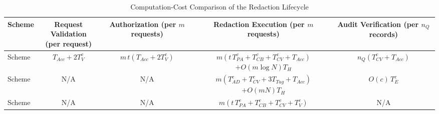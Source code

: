 \documentclass[lettersize,journal]{IEEEtran}
\begin{document}
    \begin{table}[t]
    \centering
    \caption{Computation-Cost Comparison of the Redaction Lifecycle}
    \label{tab:comp-cost}
    \footnotesize
    \renewcommand{\arraystretch}{1.25}
    \setlength{\tabcolsep}{4pt}
    \begin{tabular}{lcccc}
    \toprule
    \textbf{Scheme} &
    \makecell{\textbf{Request Validation}\\\textbf{(per request)}} &
    \makecell{\textbf{Authorization}\\\textbf{(per $m$ requests)}} &
    \makecell{\textbf{Redaction Execution}\\\textbf{(per $m$ requests)}} &
    \makecell{\textbf{Audit Verification}\\\textbf{(per $n_Q$ records)}} \\
    \midrule
    
    Scheme~\cite{ref1}
    & $T_{Acc}+2T_V^{c}$
    & $m\,t(T_{Acc}+2T_V^{c})$
    & \makecell{$m(t\,T_{PA}^{c}+T_{CB}^{c}+T_{CV}^{c}+T_{Acc})$\\$+O(m\log N)T_H$}
    & $n_Q(T_{CV}^{c}+T_{Acc})$ \\
    
    Scheme~\cite{ref13}
    & N/A
    & N/A
    & \makecell{$m(T_{AD}^{c}+T_{CV}^{c}+3T_{Tag}+T_{Acc})$\\$+O(mN)T_H$}
    & $O(c)\,T_E^{c}$ \\
    
    Scheme~\cite{ref27}
    & N/A
    & N/A
    & $m(t\,T_{PA}^{c}+T_{CB}^{c}+T_{CV}^{c}+T_V^{c})$
    & N/A \\
    

\end{tabular}
\end{table}
\end{document}
